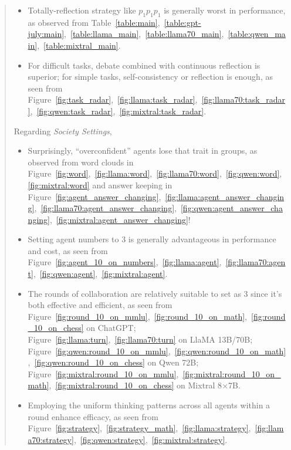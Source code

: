 \documentclass[11pt]{article}
\begin{document}
\begin{abstract}
\begin{itemize}
    \item Totally-reflection strategy like $p_1p_1p_1$ is generally worst in performance, as observed from Table~\ref{table:main},~\ref{table:gpt-july:main},~\ref{table:llama_main},~\ref{table:llama70_main},~\ref{table:qwen_main},~\ref{table:mixtral_main}. 

    \item For difficult tasks, debate combined with continuous reflection is superior; for simple tasks, self-consistency or reflection is enough, as seen from Figure~\ref{fig:task_radar},~\ref{fig:llama:task_radar},~\ref{fig:llama70:task_radar},~\ref{fig:qwen:task_radar},~\ref{fig:mixtral:task_radar}. 
\end{itemize}

Regarding \textit{Society Settings}, 
\begin{itemize}
    \item Surprisingly, ``overconfident'' agents lose that trait in groups, as observed from word clouds in Figure~\ref{fig:word},~\ref{fig:llama:word},~\ref{fig:llama70:word},~\ref{fig:qwen:word},~\ref{fig:mixtral:word} and answer keeping in Figure~\ref{fig:agent_answer_changing},~\ref{fig:llama:agent_answer_changing},~\ref{fig:llama70:agent_answer_changing},~\ref{fig:qwen:agent_answer_changing},~\ref{fig:mixtral:agent_answer_changing}!

    \item Setting agent numbers to 3 is generally advantageous in performance and cost, as seen from Figure~\ref{fig:agent_10_on_numbers},~\ref{fig:llama:agent},~\ref{fig:llama70:agent},~\ref{fig:qwen:agent},~\ref{fig:mixtral:agent}. 
    
    \item The rounds of collaboration are relatively suitable to set as 3 since it's both effective and efficient, as seen from 
    Figure~\ref{fig:round_10_on_mmlu},~\ref{fig:round_10_on_math},~\ref{fig:round_10_on_chess} on ChatGPT; 
    Figure~\ref{fig:llama:turn},~\ref{fig:llama70:turn} on LlaMA 13B/70B; 
    Figure~\ref{fig:qwen:round_10_on_mmlu},~\ref{fig:qwen:round_10_on_math},~\ref{fig:qwen:round_10_on_chess} on Qwen 72B; 
    Figure~\ref{fig:mixtral:round_10_on_mmlu},~\ref{fig:mixtral:round_10_on_math},~\ref{fig:mixtral:round_10_on_chess} on Mixtral 8$\times$7B. 

    \item Employing the uniform thinking patterns across all agents within a round enhance efficacy, as seen from Figure~\ref{fig:strategy},~\ref{fig:strategy_math},~\ref{fig:llama:strategy},~\ref{fig:llama70:strategy},~\ref{fig:qwen:strategy},~\ref{fig:mixtral:strategy}. 
\end{itemize}


\end{abstract}
\end{document}
